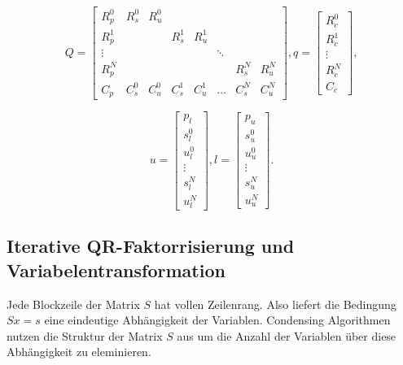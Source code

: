 $$Q=\left[ \begin{array}{cccccccc}
R_p^0 & R_s^0 & R_u^0 &  &  &  &  &  \\ 
R_p^1 &  &  & R_s^1 & R_u^1 &  &  &  \\ 
\vdots &  &  &  &  & \ddots &  &  \\ 
R_p^{N} &  &  &  &  &  & R_s^{N} & R_u^{N} \\ 
C_p & C_s^0 & C_u^0 & C_s^1 & C_u^1 & \hdots & C_s^{N} & C_u^{N}
\end{array}  \right],
q= \left[ \begin{array}{c}
R_c^0 \\ 
R_c^1 \\ 
\vdots \\ 
R_c^{N} \\ 
C_c
\end{array}  \right],$$

$$u= \left[ \begin{array}{c}
p_l \\ 
s^0_l \\ 
u^0_l \\ 
\vdots \\ 
s^{N}_l \\ 
u^{N}_l
\end{array} \right],
l= \left[ \begin{array}{c}
p_u \\ 
s^0_u \\ 
u^0_u \\ 
\vdots \\ 
s^{N}_u \\ 
u^{N}_u
\end{array} \right].$$

\subsection{ Iterative QR-Faktorrisierung und Variabelentransformation} 

Jede Blockzeile der Matrix $S$ hat vollen Zeilenrang.  Also liefert die Bedingung $Sx=s$ eine eindeutige Abhängigkeit der Variablen. Condensing Algorithmen nutzen die Struktur der Matrix $S$ aus um die Anzahl der Variablen über diese Abhängigkeit zu eleminieren. 

